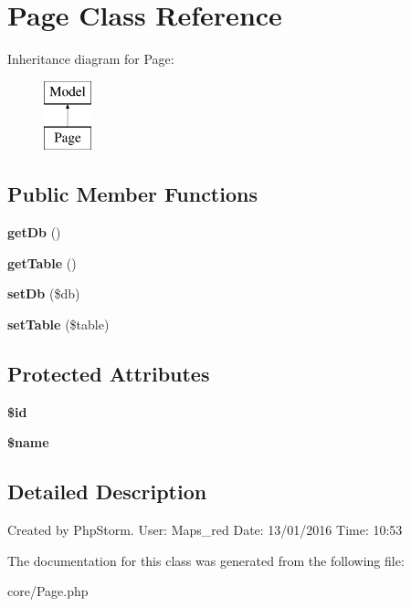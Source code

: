 \hypertarget{classPage}{}\section{Page Class Reference}
\label{classPage}
Inheritance diagram for Page\+:\begin{figure}[H]
\begin{center}
\leavevmode
\includegraphics[height=2.000000cm]{classPage}
\end{center}
\end{figure}
\subsection*{Public Member Functions}
\begin{DoxyCompactItemize}
\item 
{\bfseries get\+Db} ()\hypertarget{classPage_a8481b02401dc179e35598afaff7fed91}{}\label{classPage_a8481b02401dc179e35598afaff7fed91}

\item 
{\bfseries get\+Table} ()\hypertarget{classPage_a038e1b5febb66587607d48aef2d3bcf9}{}\label{classPage_a038e1b5febb66587607d48aef2d3bcf9}

\item 
{\bfseries set\+Db} (\$db)\hypertarget{classPage_a9fd05f80e3fa5c650060bb6935f8260b}{}\label{classPage_a9fd05f80e3fa5c650060bb6935f8260b}

\item 
{\bfseries set\+Table} (\$table)\hypertarget{classPage_a1bc8b15e5aa9e4b322d101863c5b31aa}{}\label{classPage_a1bc8b15e5aa9e4b322d101863c5b31aa}

\end{DoxyCompactItemize}
\subsection*{Protected Attributes}
\begin{DoxyCompactItemize}
\item 
{\bfseries \$id}\hypertarget{classPage_a6764279abefde9af58df58a68f9e19fd}{}\label{classPage_a6764279abefde9af58df58a68f9e19fd}

\item 
{\bfseries \$name}\hypertarget{classPage_a058250d4287545c7a78b50b50316a184}{}\label{classPage_a058250d4287545c7a78b50b50316a184}

\end{DoxyCompactItemize}


\subsection{Detailed Description}
Created by Php\+Storm. User\+: Maps\+\_\+red Date\+: 13/01/2016 Time\+: 10\+:53 

The documentation for this class was generated from the following file\+:\begin{DoxyCompactItemize}
\item 
core/Page.\+php\end{DoxyCompactItemize}
